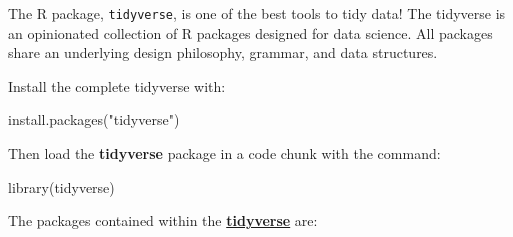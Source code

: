 \documentclass[
]{book}
\newenvironment{Shaded}{\begin{snugshade}}{\end{snugshade}}
\newcommand{\FunctionTok}[1]{\textcolor[rgb]{0.00,0.00,0.00}{#1}}
\newcommand{\NormalTok}[1]{#1}
\newcommand{\StringTok}[1]{\textcolor[rgb]{0.31,0.60,0.02}{#1}}
\begin{document}
The R package, \texttt{tidyverse}, is one of the best tools to tidy data! The tidyverse is an opinionated collection of R packages designed for data science. All packages share an underlying design philosophy, grammar, and data structures.

Install the complete tidyverse with:

\begin{Shaded}
\begin{Highlighting}[]
\FunctionTok{install.packages}\NormalTok{(}\StringTok{"tidyverse"}\NormalTok{)}
\end{Highlighting}
\end{Shaded}

Then load the \textbf{tidyverse} package in a code chunk with the command:

\begin{Shaded}
\begin{Highlighting}[]
\FunctionTok{library}\NormalTok{(tidyverse)}
\end{Highlighting}
\end{Shaded}

The packages contained within the \href{https://www.tidyverse.org/packages/}{\textbf{tidyverse}} are:
\end{document}
